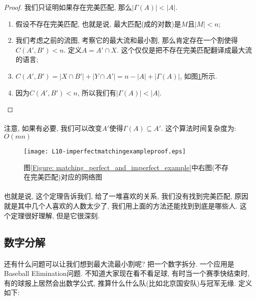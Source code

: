 \documentclass[a4paper]{article}
\renewcommand{\figurename}{图}
\begin{document}
        \begin{proof}
我们只证明如果存在完美匹配, 那么$ |\Gamma(A) | < |A|$.
\begin{enumerate}
\item 假设不存在完美匹配, 也就是说, 最大匹配(成的对数)是$M$且$|M| < n$;
\item 我们考虑之前的流图, 考察它的最大流和最小割, 那么肯定存在一个割使得$C(A', B') < n$. 定义$A=A'\cap X$. 这个仅仅是把不存在完美匹配翻译成最大流的语言;
\item $C(A', B') = | X \cap B' | + | Y \cap A' | = n-|A| + | \Gamma( A ) |$, 如\figurename\ref{Figure: matching_imperfect_matching_example_proof}所示.
\item 因为$ C(A', B') < n$, 所以我们有$ |\Gamma(A) | < |A|$.
\end{enumerate}
\end{proof}
    \paragraph{}注意, 如果有必要, 我们可以改变$A'$使得$\Gamma(A)  \subseteq A'$. 这个算法时间复杂度为: $O(mn)$
        
        \begin{figure}[h]
            \centering
            \texttt{[image: L10-imperfectmatchingexampleproof.eps]}
            \caption{\figurename\ref{Figure: matching_perfect_and_imperfect_example}中右图(不存在完美匹配)对应的网络图}
            \label{Figure: matching_imperfect_matching_example_proof}
        \end{figure}
        \paragraph{}也就是说, 这个定理告诉我们, 给了一堆喜欢的关系, 我们没有找到完美匹配, 原因就是其中几个人喜欢的人数太少了, 我们用上面的方法还能找到到底是哪些人. 这个定理很好理解, 但是它很深刻.


        \subsection{数字分解}
        \paragraph{}还有什么问题可以让我们想到最大流最小割呢? 把一个数字拆分. 一个应用是{\sc Baseball Elimination}问题. 不知道大家现在看不看足球, 有时当一个赛季快结束时, 有的球报上居然会出数学公式, 推算什么什么队(比如北京国安队)与冠军无缘. 定义如下:
\end{document}
